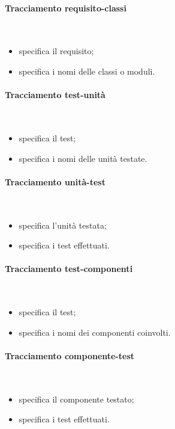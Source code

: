 \paragraph{Tracciamento requisito-classi} \hfill \\
\begin{itemize}
\item {}specifica il requisito;
\item {}specifica i nomi delle classi o moduli.
\end{itemize}

\paragraph{Tracciamento test-unità} \hfill \\
\begin{itemize}
\item {}specifica il test;
\item {}specifica i nomi delle unità testate.
\end{itemize}
\paragraph{Tracciamento unità-test} \hfill \\
\begin{itemize}
\item {}specifica l'unità testata;
\item {}specifica i test effettuati.
\end{itemize}
\paragraph{Tracciamento test-componenti} \hfill \\
\begin{itemize}
\item {}specifica il test;
\item {}specifica i nomi dei componenti coinvolti.
\end{itemize}
\paragraph{Tracciamento componente-test} \hfill \\
\begin{itemize}
\item {}specifica il componente testato;
\item {}specifica i test effettuati.
\end{itemize}
